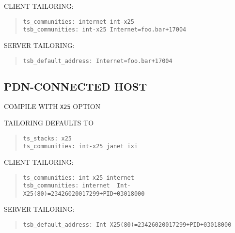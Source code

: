 \begin{bwslide}

\begin{nrtc}
\item	CLIENT TAILORING:
\begin{quote}\small\begin{verbatim}
ts_communities: internet int-x25
tsb_communities: int-x25 Internet=foo.bar+17004
\end{verbatim}\end{quote}

\item	SERVER TAILORING:
\begin{quote}\small\begin{verbatim}
tsb_default_address: Internet=foo.bar+17004
\end{verbatim}\end{quote}
\end{nrtc}
\end{bwslide}


\begin{bwslide}
\part*	{PDN-CONNECTED HOST}\bf

\begin{nrtc}
\item	COMPILE WITH \verb"X25" OPTION

\item	TAILORING DEFAULTS TO
\begin{quote}\small\begin{verbatim}
ts_stacks: x25
ts_communities: int-x25 janet ixi
\end{verbatim}\end{quote}
\end{nrtc}
\end{bwslide}


\begin{bwslide}

\begin{nrtc}
\item	CLIENT TAILORING:
\begin{quote}\small\begin{verbatim}
ts_communities: int-x25 internet
tsb_communities: internet  Int-X25(80)=23426020017299+PID+03018000
\end{verbatim}\end{quote}

\item	SERVER TAILORING:
\begin{quote}\small\begin{verbatim}
tsb_default_address: Int-X25(80)=23426020017299+PID+03018000
\end{verbatim}\end{quote}
\end{nrtc}
\end{bwslide}



